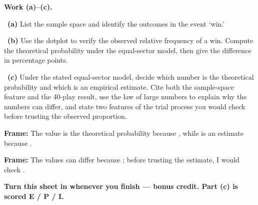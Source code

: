 \documentclass[11pt]{article}
\begin{document}
\newpage
\textbf{Work (a)--(c).}\par\smallskip

~\textbf{(a)} List the sample space and identify the outcomes in the event `win.'\par
\workspace{0.7in}

~\textbf{(b)} Use the dotplot to verify the observed relative frequency of a win. Compute the theoretical probability under the equal-sector model, then give the difference in percentage points.\par
\workspace{1.3in}

~\textbf{(c)} Under the stated equal-sector model, decide which number is the theoretical probability and which is an empirical estimate. Cite both the sample-space feature and the 40-play result, use the law of large numbers to explain why the numbers can differ, and state two features of the trial process you would check before trusting the observed proportion.\par
\workspace{2.0in}

\begin{sentenceframebox}\raggedright\textbf{Frame:} The value \blank[0.7in] is the theoretical probability because \blank[2.5in], while \blank[0.7in] is an estimate because \blank[2.1in].\end{sentenceframebox}

\begin{sentenceframebox}\raggedright\textbf{Frame:} The values can differ because \blank[2.6in]; before trusting the estimate, I would check \blank[2.5in].\end{sentenceframebox}

\textbf{Turn this sheet in whenever you finish --- bonus credit. Part (c) is scored E / P / I.}\par
\end{document}
